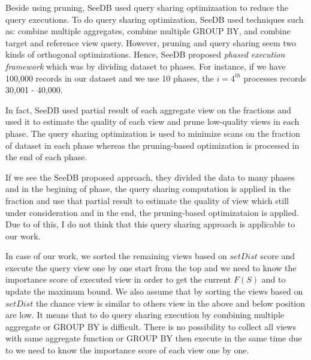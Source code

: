 \documentclass{article}
\begin{document}
Beside using pruning, SeeDB used query sharing optimizaation to reduce the query executions. To do query sharing optimization, SeeDB used techniques such as: combine multiple aggregates, combine multiple GROUP BY, and combine target and reference view query. However, pruning and query sharing seem two kinds of orthogonal optimizations. Hence, SeeDB proposed \textit{phased execution framework} which was by dividing dataset to phases. For instance, if we have 100,000 records in our dataset and we use 10 phases, the $i = 4^{th}$ processes records 30,001 - 40,000. 

In fact, SeeDB used partial result of each aggregate view on the fractions and used it to estimate the quality of each view and prune low-quality views in each phase. The query sharing optimization is used to minimize scans on the fraction of dataset in each phase whereas the pruning-based optimization is processed in the end of each phase.

If we see the SeeDB proposed approach, they divided the data to many phases and in the begining of phase, the query sharing computation is applied in the fraction and use that partial result to estimate the quality of view which still under consideration and in the end, the pruning-based optimizataion is applied. Due to of this, I do not think that this query sharing approach is applicable to our work. 

In case of our work, we sorted the remaining views based on $setDist$ score and execute the query view one by one start from the top and we need to know the importance score of executed view in order to get the current $ F(S) $ and to update the maximum bound. We also assume that by sorting the views based on $setDist$ the chance view is similar to others view in the above and below position are low. It means that to do query sharing execution by combining multiple aggregate or GROUP BY is difficult. There is no possibility to collect all views with same aggregate function or GROUP BY then execute in the same time due to we need to know the importance score of each view one by one.     
\end{document}
